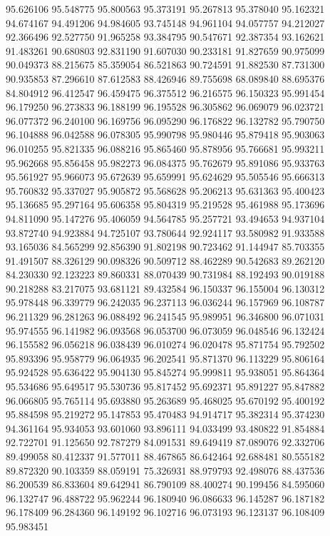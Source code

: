 95.626106
95.548775
95.800563
95.373191
95.267813
95.378040
95.162321
94.674167
94.491206
94.984605
93.745148
94.961104
94.057757
94.212027
92.366496
92.527750
91.965258
93.384795
90.547671
92.387354
93.162621
91.483261
90.680803
92.831190
91.607030
90.233181
91.827659
90.975099
90.049373
88.215675
85.359054
86.521863
90.724591
91.882530
87.731300
90.935853
87.296610
87.612583
88.426946
89.755698
68.089840
88.695376
84.804912
96.412547
96.459475
96.375512
96.216575
96.150323
95.991454
96.179250
96.273833
96.188199
96.195528
96.305862
96.069079
96.023721
96.077372
96.240100
96.169756
96.095290
96.176822
96.132782
95.790750
96.104888
96.042588
96.078305
95.990798
95.980446
95.879418
95.903063
96.010255
95.821335
96.088216
95.865460
95.878956
95.766681
95.993211
95.962668
95.856458
95.982273
96.084375
95.762679
95.891086
95.933763
95.561927
95.966073
95.672639
95.659991
95.624629
95.505546
95.666313
95.760832
95.337027
95.905872
95.568628
95.206213
95.631363
95.400423
95.136685
95.297164
95.606358
95.804319
95.219528
95.461988
95.173696
94.811090
95.147276
95.406059
94.564785
95.257721
93.494653
94.937104
93.872740
94.923884
94.725107
93.780644
92.924117
93.580982
91.933588
93.165036
84.565299
92.856390
91.802198
90.723462
91.144947
85.703355
91.491507
88.326129
90.098326
90.509712
88.462289
90.542683
89.262120
84.230330
92.123223
89.860331
88.070439
90.731984
88.192493
90.019188
90.218288
83.217075
93.681121
89.432584
96.150337
96.155004
96.130312
95.978448
96.339779
96.242035
96.237113
96.036244
96.157969
96.108787
96.211329
96.281263
96.088492
96.241545
95.989951
96.346800
96.071031
95.974555
96.141982
96.093568
96.053700
96.073059
96.048546
96.132424
96.155582
96.056218
96.038439
96.010274
96.020478
95.871754
95.792502
95.893396
95.958779
96.064935
96.202541
95.871370
96.113229
95.806164
95.924528
95.636422
95.904130
95.845274
95.999811
95.938051
95.864364
95.534686
95.649517
95.530736
95.817452
95.692371
95.891227
95.847882
96.066805
95.765114
95.693880
95.263689
95.468025
95.670192
95.400192
95.884598
95.219272
95.147853
95.470483
94.914717
95.382314
95.374230
94.361164
95.934053
93.601060
93.896111
94.033499
93.480822
91.854884
92.722701
91.125650
92.787279
84.091531
89.649419
87.089076
92.332706
89.499058
80.412337
91.577011
88.467865
86.642464
92.688481
80.555182
89.872320
90.103359
88.059191
75.326931
88.979793
92.498076
88.437536
86.200539
86.833604
89.642941
86.790109
88.400274
90.199456
84.595060
96.132747
96.488722
95.962244
96.180940
96.086633
96.145287
96.187182
96.178409
96.284360
96.149192
96.102716
96.073193
96.123137
96.108409
95.983451
